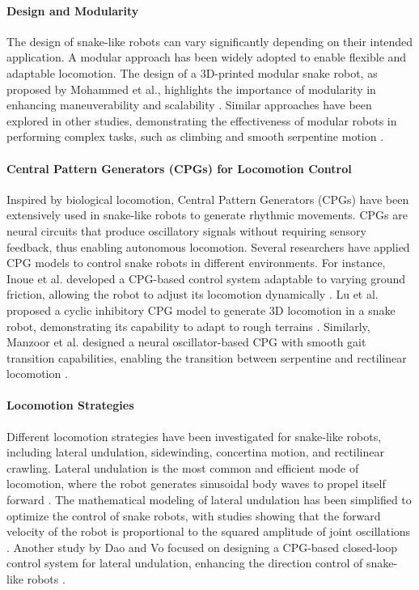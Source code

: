 \documentclass[12pt,a4paper]{report}
\begin{document}
\paragraph{Design and Modularity}
The design of snake-like robots can vary significantly depending on their intended application. A modular approach has been widely adopted to enable flexible and adaptable locomotion. The design of a 3D-printed modular snake robot, as proposed by Mohammed et al., highlights the importance of modularity in enhancing maneuverability and scalability \cite{Mohammed2016}. Similar approaches have been explored in other studies, demonstrating the effectiveness of modular robots in performing complex tasks, such as climbing and smooth serpentine motion \cite{Bayraktaroglu2006}.

\paragraph{Central Pattern Generators (CPGs) for Locomotion Control}
Inspired by biological locomotion, Central Pattern Generators (CPGs) have been extensively used in snake-like robots to generate rhythmic movements. CPGs are neural circuits that produce oscillatory signals without requiring sensory feedback, thus enabling autonomous locomotion. Several researchers have applied CPG models to control snake robots in different environments. For instance, Inoue et al. developed a CPG-based control system adaptable to varying ground friction, allowing the robot to adjust its locomotion dynamically \cite{Inoue2007}. Lu et al. proposed a cyclic inhibitory CPG model to generate 3D locomotion in a snake robot, demonstrating its capability to adapt to rough terrains \cite{Lu2006}. Similarly, Manzoor et al. designed a neural oscillator-based CPG with smooth gait transition capabilities, enabling the transition between serpentine and rectilinear locomotion \cite{manzoor-2019}.

\paragraph{Locomotion Strategies}
Different locomotion strategies have been investigated for snake-like robots, including lateral undulation, sidewinding, concertina motion, and rectilinear crawling. Lateral undulation is the most common and efficient mode of locomotion, where the robot generates sinusoidal body waves to propel itself forward \cite{liljeback-2013}. The mathematical modeling of lateral undulation has been simplified to optimize the control of snake robots, with studies showing that the forward velocity of the robot is proportional to the squared amplitude of joint oscillations \cite{liljeback-2013}. Another study by Dao and Vo focused on designing a CPG-based closed-loop control system for lateral undulation, enhancing the direction control of snake-like robots \cite{wang2020cpg}.
\end{document}
